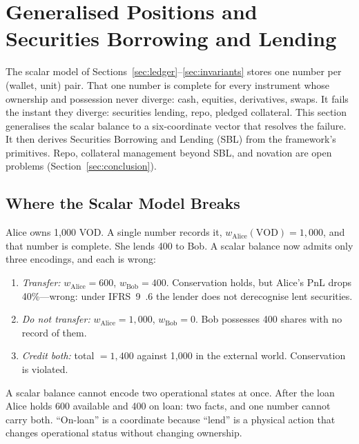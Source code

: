\section{Generalised Positions and Securities Borrowing and Lending}
\label{sec:gpm}

The scalar model of Sections~\ref{sec:ledger}--\ref{sec:invariants} stores one number per (wallet, unit) pair. That one number is complete for every instrument whose ownership and possession never diverge: cash, equities, derivatives, swaps. It fails the instant they diverge: securities lending, repo, pledged collateral. This section generalises the scalar balance to a six-coordinate vector that resolves the failure. It then derives Securities Borrowing and Lending (SBL) from the framework's primitives. Repo, collateral management beyond SBL, and novation are open problems (Section~\ref{sec:conclusion}).

\subsection{Where the Scalar Model Breaks}
\label{sec:scalar-breaks}

Alice owns 1{,}000 VOD. A single number records it, $w_{\mathrm{Alice}}(\text{VOD}) = 1{,}000$, and that number is complete. She lends 400 to Bob. A scalar balance now admits only three encodings, and each is wrong:

\begin{enumerate}[nosep]
\item \emph{Transfer:} $w_{\mathrm{Alice}} = 600$, $w_{\mathrm{Bob}} = 400$. Conservation holds, but Alice's PnL drops 40\%---wrong: under IFRS~9~.6 the lender does not derecognise lent securities.
\item \emph{Do not transfer:} $w_{\mathrm{Alice}} = 1{,}000$, $w_{\mathrm{Bob}} = 0$. Bob possesses 400 shares with no record of them.
\item \emph{Credit both:} total $= 1{,}400$ against 1{,}000 in the external world. Conservation is violated.
\end{enumerate}

A scalar balance cannot encode two operational states at once. After the loan Alice holds 600 available and 400 on loan: two facts, and one number cannot carry both. ``On-loan'' is a coordinate because ``lend'' is a physical action that changes operational status without changing ownership.

